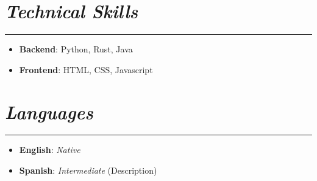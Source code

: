\documentclass[11pt,a4paper]{article}
\newcommand{\customsection}[1]{
    \section*{{{\textbf{\textit{#1}}}}}

    \vspace{-2em}
    \rule{\textwidth}{0.4pt}

}
\begin{document}
\customsection{Technical Skills}

\begin{itemize}[label=$\bullet$, leftmargin=*]
	\item \textbf{Backend}: Python, Rust, Java
	\item \textbf{Frontend}: HTML, CSS, Javascript
\end{itemize}

\customsection{Languages}

\begin{itemize}[label=$\bullet$, leftmargin=*]
	\item \textbf{English}: \textit{Native} \item \textbf{Spanish}: \textit{Intermediate} (Description)
\end{itemize}
\end{document}
